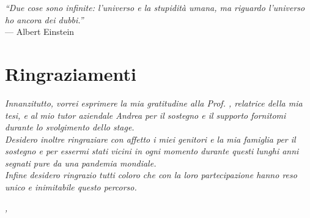 \cleardoublepage
{}
{}

\begin{flushright}{
    \slshape
    ``Due cose sono infinite: l’universo e la stupidità umana, ma riguardo l’universo ho ancora dei dubbi.''} \\
    \medskip
    --- Albert Einstein
\end{flushright}


\bigskip

\begingroup
\let\clearpage\relax
\let\cleardoublepage\relax
\let\cleardoublepage\relax

\chapter*{Ringraziamenti}

\noindent \textit{Innanzitutto, vorrei esprimere la mia gratitudine alla Prof. \myProf, relatrice della mia tesi, e al mio tutor aziendale Andrea per il sostegno e il supporto fornitomi durante lo svolgimento dello stage.}\\

\noindent \textit{Desidero inoltre ringraziare con affetto i miei genitori e la mia famiglia per il sostegno e per essermi stati vicini in ogni momento durante questi lunghi anni segnati pure da una pandemia mondiale.}\\

\noindent \textit{Infine desidero ringrazio tutti coloro che con la loro partecipazione hanno reso unico e inimitabile questo percorso.}\\
\bigskip

\noindent\textit{\myLocation, \myTime}
\hfill \myName

\endgroup
